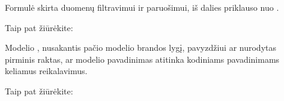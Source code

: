 \documentclass[letterpaper,10pt,lithuanian]{sphinxmanual}
\begin{document}
\begin{fulllineitems}
\label{\detokenize{dimensijos:model.prepare}}
\pysigstartsignatures
\pysigline
{}
\pysigstopsignatures
\sphinxAtStartPar
Formulė skirta duomenų filtravimui ir paruošimui, iš dalies priklauso nuo
{\hyperref[\detokenize{dimensijos:resource.type}]{}}.


\begin{sphinxseealso}{Taip pat žiūrėkite:}

\begin{DUlineblock}{0em}
\item[] {\hyperref[\detokenize{formules:formules}]{}}
\item[] {\hyperref[\detokenize{formules:duomenu-atranka}]{}}
\end{DUlineblock}


\end{sphinxseealso}


\end{fulllineitems}


\begin{fulllineitems}
\label{\detokenize{dimensijos:model.level}}
\pysigstartsignatures
\pysigline
{}
\pysigstopsignatures
\sphinxAtStartPar
Modelio {\hyperref[\detokenize{branda:level}]{}}, nusakantis pačio modelio brandos
lygį, pavyzdžiui ar nurodytas pirminis raktas, ar modelio pavadinimas
atitinka kodiniams pavadinimams keliamus reikalavimus.


\begin{sphinxseealso}{Taip pat žiūrėkite:}

\sphinxAtStartPar
{\hyperref[\detokenize{identifikatoriai:ref-level}]{}}


\end{sphinxseealso}


\end{fulllineitems}

\end{document}

